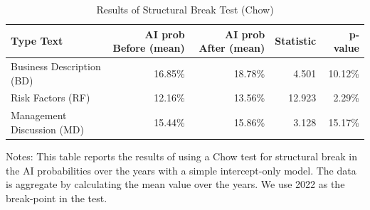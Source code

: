 \begin{table}[t]
\caption{Results of Structural Break Test (Chow) \label{tab:chow}} 
\fontsize{9.0pt}{11.0pt}\selectfont
\begin{tabular*}{\linewidth}{@{\extracolsep{\fill}}lrrrr}
\toprule
Type Text & AI prob Before (mean) & AI prob After (mean) & Statistic & p-value \\ 
\midrule\addlinespace[2.5pt]
Business Description (BD) & 16.85\% & 18.78\% &  4.501 & 10.12\% \\ 
Risk Factors (RF) & 12.16\% & 13.56\% & 12.923 & 2.29\% \\ 
Management Discussion (MD) & 15.44\% & 15.86\% &  3.128 & 15.17\% \\ 
\bottomrule
\end{tabular*}
\begin{minipage}{\linewidth}
\vspace{.05em}
Notes: This table reports the results of using a Chow test for structural break in the AI probabilities over the years with a simple intercept-only model. The data is aggregate by calculating the mean value over the years. We use 2022 as the break-point in the test.\\
\end{minipage}
\end{table}

